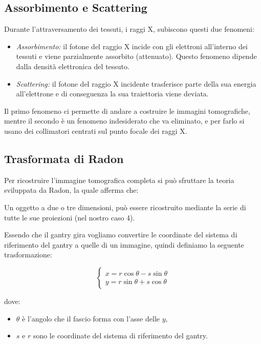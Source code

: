 \subsection{Assorbimento e Scattering}

Durante l'attraversamento dei tessuti, i raggi X, subiscono questi due fenomeni:

\begin{itemize}
    \item \textit{Assorbimento:} il fotone del raggio X incide con gli elettroni
          all'interno dei tessuti e viene parzialmente assorbito (attenuato).
          Questo fenomeno dipende dalla densità elettronica del tessuto.
    \item  \textit{Scattering:} il fotone del raggio X incidente trasferisce parte della
          sua energia all'elettrone e di conseguenza la sua traiettoria viene deviata.
\end{itemize}

Il primo fenomeno ci permette di andare a costruire le immagini tomografiche,
mentre il secondo è un fenomeno indesiderato che va eliminato, e per farlo si
usano dei collimatori centrati sul punto focale dei raggi X.

\subsection{Trasformata di Radon}

Per ricostruire l'immagine tomografica completa si può sfruttare la teoria
sviluppata da Radon, la quale afferma che:

\begin{definition}
    Un oggetto a due o tre dimensioni, può essere ricostruito mediante la serie
    di tutte le sue proiezioni (nel nostro caso 4).
\end{definition}

Essendo che il gantry  gira vogliamo convertire le coordinate del sistema
di riferimento del gantry a quelle di un immagine, quindi definiamo la seguente
trasformazione:

$$
    \begin{cases}
        x = r \cos \theta - s \sin \theta \\
        y = r \sin \theta + s \cos \theta
    \end{cases}
$$

dove:
\begin{itemize}
    \item $\theta$ è l'angolo che il fascio forma con l'asse delle $y$,
    \item $s$ e $r$ sono le coordinate del sistema di riferimento del gantry.
\end{itemize}

